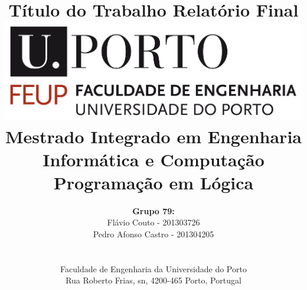 \documentclass[a4paper]{article}
\begin{document}
\setlength{\textwidth}{16cm}
\setlength{\textheight}{22cm}

\title{\Huge\textbf{Título do Trabalho}\linebreak\linebreak\linebreak
\Large\textbf{Relatório Final}\linebreak\linebreak
\linebreak\linebreak
\includegraphics[scale=0.1]{feup-logo.png}\linebreak\linebreak
\linebreak\linebreak
\Large{Mestrado Integrado em Engenharia Informática e Computação} \linebreak\linebreak
\Large{Programação em Lógica}\linebreak
}

\author{\textbf{Grupo 79:}\\
Flávio Couto - 201303726 \\
Pedro Afonso Castro - 201304205 \\
\linebreak\linebreak \\
 \\ Faculdade de Engenharia da Universidade do Porto \\ Rua Roberto Frias, s\/n, 4200-465 Porto, Portugal \linebreak\linebreak\linebreak
\linebreak\linebreak\vspace{1cm}}
\maketitle
\thispagestyle{empty}
\end{document}
